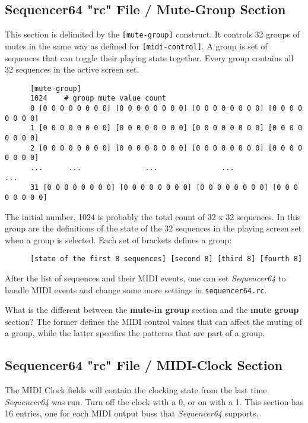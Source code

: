 \subsection{Sequencer64 "rc" File / Mute-Group Section}
\label{subsec:seq64_rc_file_mute_group}
     
   This section is delimited by the \texttt{[mute-group]} construct.
   It controls 32 groups of mutes in the same way as defined for
   \texttt{[midi-control]}. A group is set of sequences that can toggle their
   playing state together.  Every group contains all 32 sequences in the
   active screen set.

   \begin{verbatim}
      [mute-group]
      1024    # group mute value count
      0 [0 0 0 0 0 0 0 0] [0 0 0 0 0 0 0 0] [0 0 0 0 0 0 0 0] [0 0 0 0 0 0 0 0]
      1 [0 0 0 0 0 0 0 0] [0 0 0 0 0 0 0 0] [0 0 0 0 0 0 0 0] [0 0 0 0 0 0 0 0]
      2 [0 0 0 0 0 0 0 0] [0 0 0 0 0 0 0 0] [0 0 0 0 0 0 0 0] [0 0 0 0 0 0 0 0]
      ...      ...               ...               ...               ...
      31 [0 0 0 0 0 0 0 0] [0 0 0 0 0 0 0 0] [0 0 0 0 0 0 0 0] [0 0 0 0 0 0 0 0]
   \end{verbatim}

   The initial number, 1024 is probably the total count of 32 x 32 sequences.
   In this group are the definitions of the state of the 32 sequences
   in the playing screen set when a group is selected.
   Each set of brackets defines a group:
   
   \begin{verbatim}
      [state of the first 8 sequences] [second 8] [third 8] [fourth 8]
   \end{verbatim}

   After the list of sequences and their MIDI events, one can 
   set \textsl{Sequencer64} to handle MIDI events and change some more settings
   in \texttt{sequencer64.rc}.

   What is the different between the \textbf{mute-in group}
   section and the \textbf{mute group} section?  The former defines the MIDI
   control values that can affect the muting of a group, while the latter
   specifies the patterns that are part of a group.

\subsection{Sequencer64 "rc" File / MIDI-Clock Section}
\label{subsec:seq64_rc_file_midi_clock}

   The MIDI Clock fields will contain the clocking state from the last 
   time \textsl{Sequencer64} was run.  Turn off the clock with a 0, or on
   with a 1.
   This section has 16 entries, one for each MIDI output buss that
   \textsl{Sequencer64} supports.

